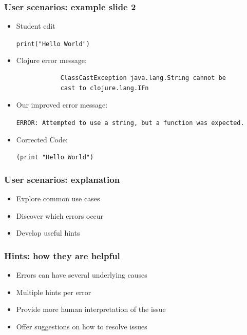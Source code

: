\documentclass{beamer}
\begin{document}
\begin{frame}[fragile]
\frametitle{User scenarios: example slide 2}

	\begin{itemize}
	\item Student edit
		
				\texttt{print("Hello World")}
				
		\item Clojure error message:	
	
			\begin{verbatim}
			ClassCastException java.lang.String cannot be
			cast to clojure.lang.IFn
			\end{verbatim} 
	
		\item Our improved error message:	
	
			\textcolor{PrettyGreen}{
			\texttt{ERROR: Attempted to use a string, but a function
			was expected.}}
	
		\item Corrected Code:
		
			\texttt{\alert{(print} "Hello World")}
	\end{itemize} 	

\end{frame}

\begin{frame}
\frametitle{User scenarios: explanation}
	\begin{itemize}
  	 \item Explore common use cases
  	 \item Discover which errors occur
  	 \item Develop useful hints
	 \end{itemize}
\end{frame}

\begin{frame}
\frametitle{Hints: how they are helpful}
	\begin{itemize}
  	 \item Errors can have several underlying causes
  	 \item Multiple hints per error
  	 \item Provide more human interpretation of the issue
  	 \item Offer suggestions on how to resolve issues
	 \end{itemize}
\end{frame}
\end{document}
